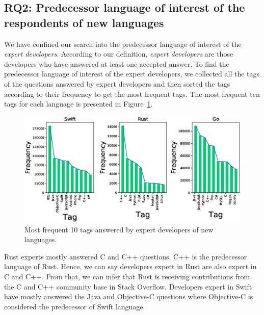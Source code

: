 \subsection{RQ2: Predecessor language of interest of the respondents of new languages}
\label{RQ5}
We have confined our search into the predecessor language of interest of the \emph{expert developers}. According to our definition,  \emph{expert developers} are those developers who have answered at least one accepted answer.
To find the predecessor language of interest of the expert developers, we collected all the tags of the questions answered by expert developers and then sorted the tags according to their frequency to get the most frequent tags. The most frequent ten tags for each language is presented in Figure~\ref{fig:dev skills}.
% 
\begin{figure}[t!]
\centering
\includegraphics[scale=0.35]{figures/Tagfrequency.eps}
\caption{Most frequent 10 tags answered by expert developers of new languages.}
\label{fig:dev skills}
\end{figure}

Rust experts mostly answered  C and C++ questions. C++ is the predecessor language of Rust. Hence, we can say developers expert in Rust are also expert in C and C++. From that, we can infer that Rust is receiving contributions from the C and C++ community base in Stack Overflow. Developers expert in Swift have mostly answered the Java and Objective-C questions where Objective-C is considered the predecessor of Swift language. 


